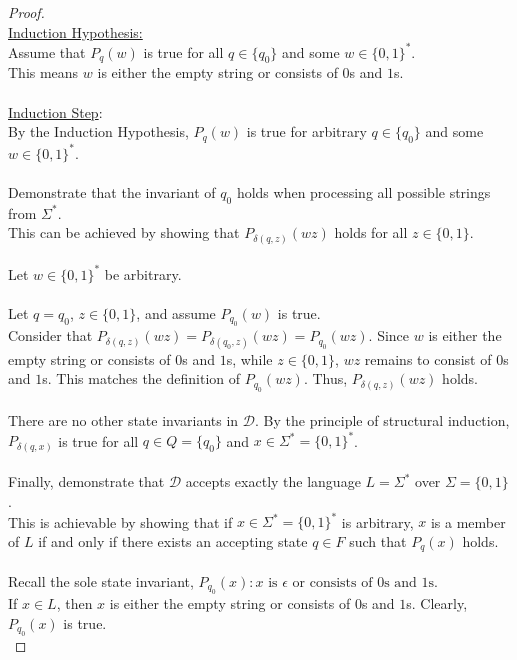 \documentclass[12pt]{article}
\begin{document}
\begin{proof}
    \\
    \underline{Induction Hypothesis:} \\
    Assume that $P_q(w)$ is true for all $q \in \{q_0\}$ and some $w \in \{0, 1\}^*$. \\
    This means $w$ is either the empty string or consists of $0$s and $1$s. \\
    \\
    \underline{Induction Step}: \\
    By the Induction Hypothesis, $P_q(w)$ is true for arbitrary $q \in \{q_0\}$ and some $w \in \{0, 1\}^*$. \\
    \\
    Demonstrate that the invariant of $q_0$ holds when processing all possible strings from $\Sigma^*$. \\
    This can be achieved by showing that $P_{\delta(q, z)}(wz)$ holds for all $z \in \{0, 1\}$. \\
    \\
    Let $w \in \{0, 1\}^*$ be arbitrary. \\
    \\
    Let $q = q_0$, $z \in \{0, 1\}$, and assume $P_{q_0}(w)$ is true. \\
    Consider that $P_{\delta(q, z)}(wz) = P_{\delta(q_0, z)}(wz) = P_{q_0}(wz)$. Since $w$ is either the empty string or consists of $0$s and $1$s, while $z \in \{0, 1\}$, $wz$ remains to consist of $0$s and $1$s. This matches the definition of $P_{q_0}(wz)$. Thus, $P_{\delta(q, z)}(wz)$ holds. \\
    \\
    There are no other state invariants in $\mathcal{D}$. By the principle of structural induction, $P_{\delta(q, x)}$ is true for all $q \in Q = \{q_0\}$ and $x \in \Sigma^* = \{0, 1\}^*$. \\
    \\
    Finally, demonstrate that $\mathcal{D}$ accepts exactly the language $L = \Sigma^*$ over $\Sigma = \{0, 1\}$. \\
    This is achievable by showing that if $x \in \Sigma^* = \{0, 1\}^*$ is arbitrary, $x$ is a member of $L$ if and only if there exists an accepting state $q \in F$ such that $P_q(x)$ holds. \\
    \\
    Recall the sole state invariant, $P_{q_0}(x): \text{$x$ is $\epsilon$ or consists of $0$s and $1$s}$. \\
    If $x \in L$, then $x$ is either the empty string or consists of $0$s and $1$s. Clearly, $P_{q_0}(x)$ is true. \\

\end{proof}
\end{document}
